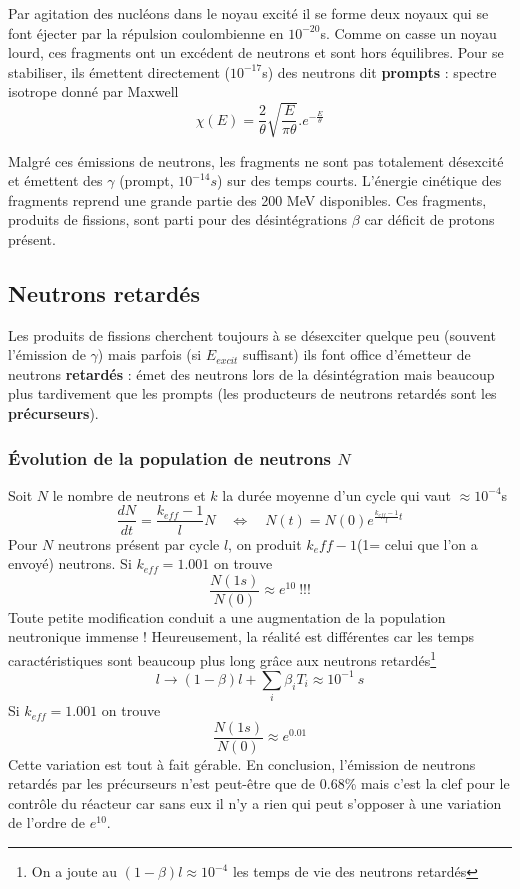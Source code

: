 Par agitation des nucléons dans le noyau excité il se forme deux noyaux qui se font éjecter par 
la répulsion coulombienne en $10^{-20}$s. Comme on casse un noyau lourd, ces fragments ont un 
excédent de neutrons et sont hors équilibres. Pour se stabiliser, ils émettent directement 
($10^{-17}$s) des neutrons dit \textbf{prompts} : spectre isotrope donné par Maxwell
\begin{equation}
\chi (E) = \frac{2}{\theta }\sqrt {\frac{E}{{\pi \theta }}} .{e^{ - \frac{E}{\theta }}}
\end{equation}

Malgré ces émissions de neutrons, les fragments ne sont pas totalement désexcité et émettent 
des $\gamma$ (prompt, $10^{-14}s$) sur des temps courts. L'énergie cinétique des fragments 
reprend une grande partie des 200 MeV disponibles. Ces fragments, produits de fissions, sont 
parti pour des désintégrations $\beta$ car déficit de protons présent.


\subsection{Neutrons retardés}
Les produits de fissions cherchent toujours à se désexciter quelque peu (souvent l'émission 
de $\gamma$) mais parfois (si $E_{excit}$ suffisant) ils font office d'émetteur de neutrons 
\textbf{retardés} : émet des neutrons lors de la désintégration mais beaucoup plus tardivement 
que les prompts (les producteurs de neutrons retardés sont les \textbf{précurseurs}).

\subsubsection{Évolution de la population de neutrons $N$}
Soit $N$ le nombre de neutrons et $k$ la durée moyenne d'un cycle qui vaut $\approx 10^{-4}$s
\begin{equation}
\frac{dN}{dt} = \dfrac{k_{eff}-1}{l}N\quad\Leftrightarrow\quad N(t)=N(0)e^{\frac{k_{eff}-1}{l}t}
\end{equation}
Pour $N$ neutrons présent par cycle $l$, on produit $k_eff-1$(1= celui que l'on a envoyé) neutrons.
Si $k_{eff}=1.001$ on trouve
\begin{equation}
\frac{N(1s)}{N(0)} \approx e^{10}\ !!!
\end{equation}
Toute petite modification conduit a une augmentation de la population neutronique immense ! 
Heureusement, la réalité est différentes car les temps caractéristiques sont beaucoup plus long 
grâce aux neutrons retardés\footnote{On a joute au $(1-\beta)l\approx 10^{-4}$ les temps de vie 
des neutrons retardés}
\begin{equation}
l \longrightarrow (1-\beta)l + \sum_i\beta_iT_i \approx 10^{-1}\ s
\end{equation}
Si $k_{eff}=1.001$ on trouve
\begin{equation}
\frac{N(1s)}{N(0)} \approx e^{0.01}
\end{equation}
Cette variation est tout à fait gérable. En conclusion, l'émission de neutrons retardés par les
précurseurs n'est peut-être que de 0.68\% mais c'est la clef pour le contrôle du réacteur car 
sans eux il n'y a rien qui peut s'opposer à une variation de l'ordre de $e^{10}$.